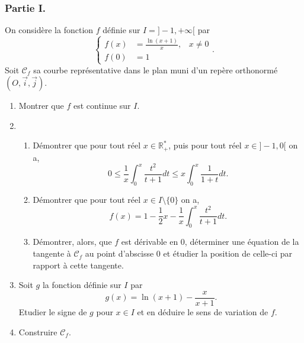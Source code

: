 \documentclass[a4paper]{article}
\begin{document}
\subsubsection*{Partie I.}
On considère la fonction $f$ définie sur $I=]-1,+\infty[$ par \[
	\begin{cases}
		f(x)&=\frac{\ln(x+1)}{x}, \; \; \; x\neq 0\\
		f(0)&=1
	\end{cases}
.\] 
Soit $\mathcal{C}_f$ sa courbe représentative dans le plan muni d'un repère orthonormé $(O,\vec{i},\vec{j})$.
\begin{enumerate}
	\item Montrer que $f$ est continue sur $I$.
	\item \begin{enumerate}[label=(\alph*)]
		\item Démontrer que pour tout réel $x\in\mathbb{R}_+^*$, puis pour tout réel $x\in]-1,0[$ on a, \[
				0\leq\frac{1}{x}\int_0^x\frac{t^2}{t+1}dt\leq x\int_0^x\frac{1}{1+t}dt
	.\]
\item Démontrer que pour tout réel $x\in I\setminus\{0\}$ on a, \[
		f(x)=1-\frac{1}{2}x-\frac{1}{x}\int_0^x\frac{t^2}{t+1}dt
.\] 
\item Démontrer, alors, que $f$ est dérivable en $0$, déterminer une équation de la tangente à $\mathcal{C}_f$ au point d'abscisse $0$ et étudier la position de celle-ci par rapport à cette tangente.
	\end{enumerate}
\item Soit $g$ la fonction définie sur $I$ par \[
		g(x)=\ln(x+1)-\frac{x}{x+1}
.\] 
Etudier le signe de $g$ pour $x\in I$ et en déduire le sens de variation de $f$.
\item Construire $\mathcal{C}_f$.
\end{enumerate}
\end{document}

